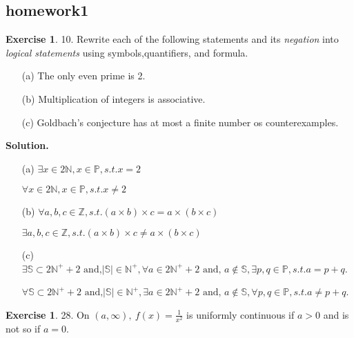 \documentclass[a4paper]{book}
\newenvironment{solution}%
{\noindent\textbf{Solution.}}%
{\qedhere}
\numberwithin{equation}{chapter}
\theoremstyle{definition}
\newtheorem{exc}[exm]{Exercise}
\begin{document}
\begin{multicols}{2}
\setlength{\columnseprule}{0.2pt}  

\section{homework1}
%
\begin{exc}
	10. Rewrite each of the following statements and its \textit{negation} into \textit{logical statements} using symbols,quantifiers, and formula.
	\begin{itemize}
		\item [(a)] The only even prime is 2.
		\item [(b)] Multiplication of integers is associative.
		\item [(c)] Goldbach's conjecture has at most a finite number os counterexamples.
	\end{itemize}
\end{exc}

\begin{solution}
	\begin{itemize}
		\item [(a)] $ \exists x \in 2\mathbb{N},x \in \mathbb{P}, s.t. x=2  $
		
		$ \forall x \in 2\mathbb{N}, x \in \mathbb{P}, s.t. x \neq 2 $
		
		\item [(b)] $ \forall a,b,c \in \mathbb{Z}, s.t. (a \times b) \times c = a \times (b \times c) $
		
		$ \exists a,b,c \in \mathbb{Z}, s.t. (a \times b) \times c \neq a \times (b \times c) $
		
		\item [(c)] $ \exists \mathbb{S} \subset 2\mathbb{N}^+ + 2 \text{ and,} |\mathbb{S}| \in \mathbb{N^+}, \forall a \in 2\mathbb{N}^+ + 2 \text{ and, } a \notin \mathbb{S}, \exists p,q \in \mathbb{P}, s.t. a = p + q$.
		
		 $ \forall \mathbb{S} \subset 2\mathbb{N}^+ + 2 \text{ and,} |\mathbb{S}| \in \mathbb{N^+}, \exists a \in 2\mathbb{N}^+ + 2 \text{ and, } a \notin \mathbb{S}, \forall p,q \in \mathbb{P}, s.t. a \neq p + q$.
	\end{itemize}
\end{solution}

\begin{exc}
	28. On $ (a, \infty), \ f(x)= \frac{1}{x^2} $ is uniformly continuous if $ a > 0 $ and is not so if $ a = 0 $.
\end{exc}


\end{multicols}
\end{document}
